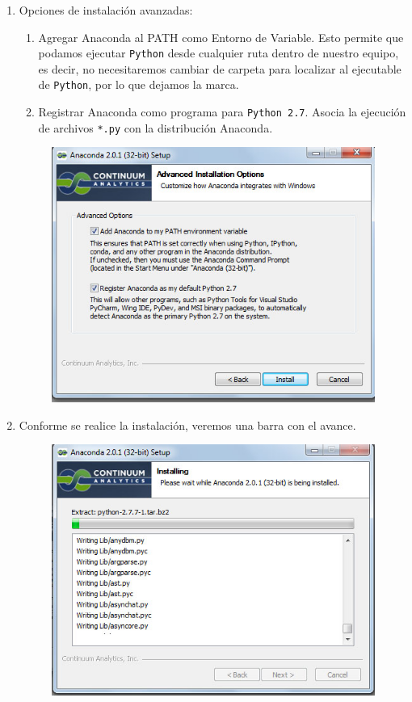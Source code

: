\documentclass[12pt]{article}
\begin{document}
\begin{enumerate}
\begin{figure}[H]
\end{figure}
\item Opciones de instalación avanzadas:
\begin{enumerate}
\item Agregar Anaconda al PATH como Entorno de Variable. Esto permite que podamos ejecutar \texttt{Python} desde cualquier ruta dentro de nuestro equipo, es decir, no necesitaremos cambiar de carpeta para localizar al ejecutable de \texttt{Python}, por lo que dejamos la marca.
\item Registrar Anaconda como programa para \texttt{Python 2.7}. Asocia la ejecución de archivos \texttt{*.py} con la distribución Anaconda.
\end{enumerate}
\begin{figure}[H]
	\centering
	\includegraphics[scale=0.5]{Imagenes/Instalacion_Anaconda_05.jpg} 
\end{figure}
\item Conforme se realice la instalación, veremos una barra con el avance.
\begin{figure}[H]
	\centering
	\includegraphics[scale=0.5]{Imagenes/Instalacion_Anaconda_06.jpg} 

\end{figure}
\end{enumerate}
\end{document}
